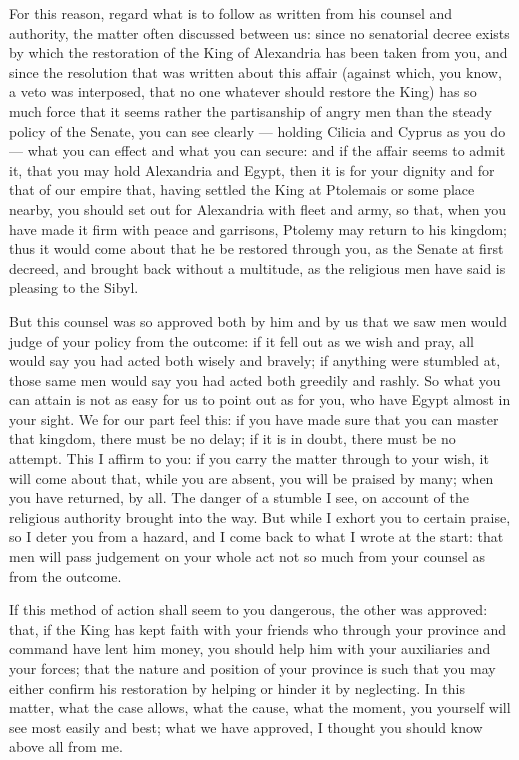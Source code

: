  For this reason, regard what is to follow as written from his counsel and authority, the matter often discussed between us: since no senatorial decree exists by which the restoration of the King of Alexandria has been taken from you, and since the resolution that was written about this affair (against which, you know, a veto was interposed, that no one whatever should restore the King) has so much force that it seems rather the partisanship of angry men than the steady policy of the Senate, you can see clearly --- holding Cilicia and Cyprus as you do --- what you can effect and what you can secure: and if the affair seems to admit it, that you may hold Alexandria and Egypt, then it is for your dignity and for that of our empire that, having settled the King at Ptolemais or some place nearby, you should set out for Alexandria with fleet and army, so that, when you have made it firm with peace and garrisons, Ptolemy may return to his kingdom; thus it would come about that he be restored through you, as the Senate at first decreed, and brought back without a multitude, as the religious men have said is pleasing to the Sibyl.

 But this counsel was so approved both by him and by us that we saw men would judge of your policy from the outcome: if it fell out as we wish and pray, all would say you had acted both wisely and bravely; if anything were stumbled at, those same men would say you had acted both greedily and rashly. So what you can attain is not as easy for us to point out as for you, who have Egypt almost in your sight. We for our part feel this: if you have made sure that you can master that kingdom, there must be no delay; if it is in doubt, there must be no attempt. This I affirm to you: if you carry the matter through to your wish, it will come about that, while you are absent, you will be praised by many; when you have returned, by all. The danger of a stumble I see, on account of the religious authority brought into the way. But while I exhort you to certain praise, so I deter you from a hazard, and I come back to what I wrote at the start: that men will pass judgement on your whole act not so much from your counsel as from the outcome.

 If this method of action shall seem to you dangerous, the other was approved: that, if the King has kept faith with your friends who through your province and command have lent him money, you should help him with your auxiliaries and your forces; that the nature and position of your province is such that you may either confirm his restoration by helping or hinder it by neglecting. In this matter, what the case allows, what the cause, what the moment, you yourself will see most easily and best; what we have approved, I thought you should know above all from me.

